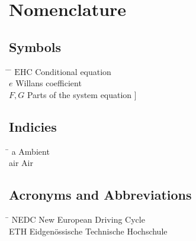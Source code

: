  \cleardoublepage


\chapter*{Nomenclature}\label{chap:symbole}

\section*{Symbols}
\begin{tabbing}
 \hspace*{1.6cm} \= \hspace*{8cm} \= \kill
 $\mathrm{EHC}$ \> Conditional equation \> [$-$] \\[0.5ex]
 $e$ \> Willans coefficient \> [$-$] \\[0.5ex]
 $F,G$ \> Parts of the system equation \> [\unitfrac[]{K}{s}]
\end{tabbing}

\section*{Indicies}
\begin{tabbing}
 \hspace*{1.6cm}  \= \kill
 a \> Ambient \\[0.5ex]
 air \> Air
\end{tabbing}

\section*{Acronyms and Abbreviations}
\begin{tabbing}
 \hspace*{1.6cm}  \= \kill
 NEDC \> New European Driving Cycle \\[0.5ex]
 ETH \> Eidgen\"{o}ssische Technische Hochschule
\end{tabbing}

 \cleardoublepage

